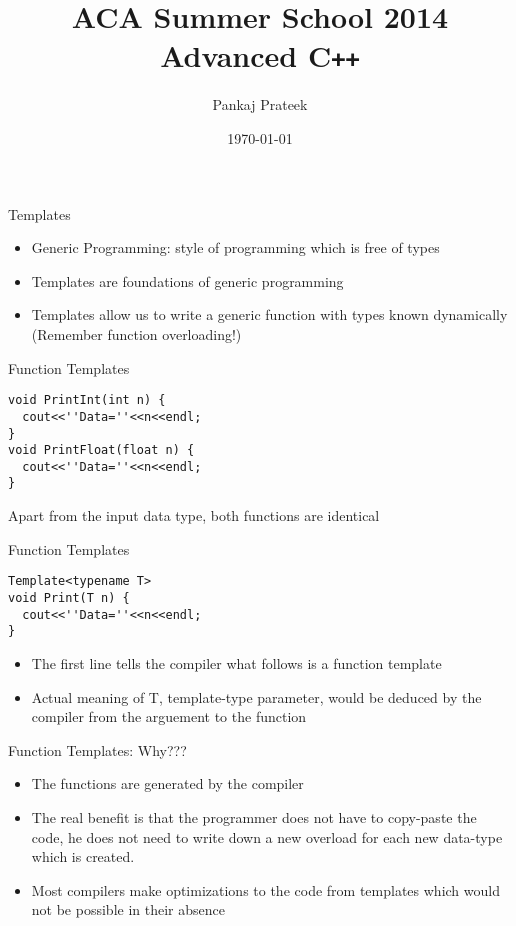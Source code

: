 \documentclass{beamer}
\title{ACA Summer School 2014\\ Advanced C\texttt{++}}
\author{Pankaj Prateek}
\institute{ACA, CSE, IIT Kanpur}
\date{\today}
\begin{document}
\begin{frame}
  \titlepage
\end{frame}


\begin{frame}[fragile]{Templates}
  \begin{itemize}
    \item Generic Programming: style of programming which is free of types\pause
    \item Templates are foundations of generic programming\pause
    \item Templates allow us to write a generic function with types known dynamically (Remember function overloading!)
  \end{itemize}
\end{frame}

\begin{frame}[fragile]{Function Templates}
  \begin{lstlisting}
void PrintInt(int n) {
  cout<<''Data=''<<n<<endl;
}
void PrintFloat(float n) {
  cout<<''Data=''<<n<<endl;
}
  \end{lstlisting}\pause
  Apart from the input data type, both functions are identical
\end{frame}

\begin{frame}[fragile]{Function Templates}
  \begin{lstlisting}
Template<typename T>
void Print(T n) {
  cout<<''Data=''<<n<<endl;
}
  \end{lstlisting}\pause
  \begin{itemize}
    \item The first line tells the compiler what follows is a function template\pause
    \item Actual meaning of T, template-type parameter, would be deduced by the compiler from the arguement to the function
  \end{itemize}
\end{frame}

\begin{frame}[fragile]{Function Templates: Why???}
  \begin{itemize}
  \item The functions are generated by the compiler\pause
  \item The real benefit is that the programmer does not have to copy-paste the code, he does not need to write down a new overload for each new data-type which is created.\pause
  \item Most compilers make optimizations to the code from templates which would not be possible in their absence
  \end{itemize}
\end{frame}
\end{document}
